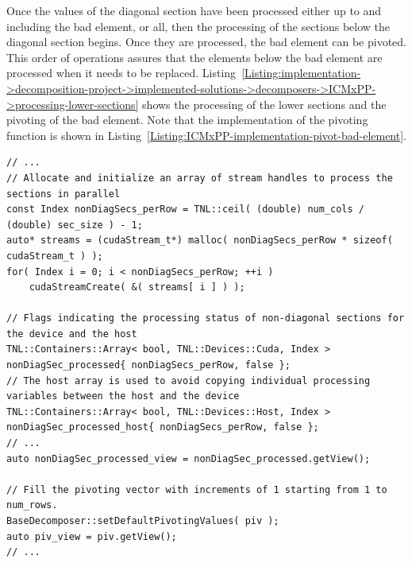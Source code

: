 Once the values of the diagonal section have been processed either up to and including the bad element, or all, then the processing of the sections below the diagonal section begins.
Once they are processed, the bad element can be pivoted.
This order of operations assures that the elements below the bad element are processed when it needs to be replaced.
Listing~\ref{Listing:implementation->decomposition-project->implemented-solutions->decomposers->ICMxPP->processing-lower-sections} shows the processing of the lower sections and the pivoting of the bad element.
Note that the implementation of the pivoting function is shown in Listing~\ref{Listing:ICMxPP-implementation-pivot-bad-element}.

\begin{lstlisting}[caption={An excerpt from the definition of the overloaded \code{decompose()} method for the ICM\_\textit{x}PP decomposer.
The excerpt highlights how the processing of lower sections, i.e., sections below a diagonal section, is implemented.
The \code{LSecCompute\_kernel()} and \code{NonDiagSecAssign\_kernel()} kernels compute and assign values of the lower sections, respectively.
The kernels are presented separately in Listings~\ref{Listing:ICMxPP-implementation->kernels->lower-section-compute} and \ref{Listing:ICMxPP-implementation->kernels->nondiagonal-assign}.},label={Listing:implementation->decomposition-project->implemented-solutions->decomposers->ICMxPP->processing-lower-sections},escapechar=@]
// ...
// Allocate and initialize an array of stream handles to process the sections in parallel
const Index nonDiagSecs_perRow = TNL::ceil( (double) num_cols / (double) sec_size ) - 1;
auto* streams = (cudaStream_t*) malloc( nonDiagSecs_perRow * sizeof( cudaStream_t ) );
for( Index i = 0; i < nonDiagSecs_perRow; ++i )
	cudaStreamCreate( &( streams[ i ] ) );

// Flags indicating the processing status of non-diagonal sections for the device and the host
TNL::Containers::Array< bool, TNL::Devices::Cuda, Index > nonDiagSec_processed{ nonDiagSecs_perRow, false };
// The host array is used to avoid copying individual processing variables between the host and the device
TNL::Containers::Array< bool, TNL::Devices::Host, Index > nonDiagSec_processed_host{ nonDiagSecs_perRow, false };
// ...
auto nonDiagSec_processed_view = nonDiagSec_processed.getView();

// Fill the pivoting vector with increments of 1 starting from 1 to num_rows.
BaseDecomposer::setDefaultPivotingValues( piv );
auto piv_view = piv.getView();
// ...


\end{lstlisting}
